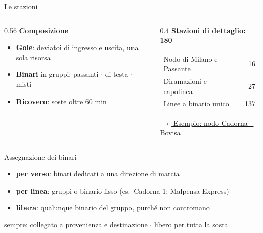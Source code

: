 \documentclass[11pt,aspectratio=169]{beamer}
\begin{document}
\begin{frame}{Le stazioni}
	\vspace*{-0.4cm}
	\begin{columns}[T]
		\begin{column}{0.56\textwidth}
			\textbf{\color{mrsAzzurro}Composizione}
			\begin{itemize}
				\item \textbf{Gole}: deviatoi di ingresso e uscita, una sola risorsa
				\item \textbf{Binari} in gruppi: passanti $\cdot$ di testa $\cdot$ misti
				\item \textbf{Ricovero}: soste oltre 60 min
			\end{itemize}
		\end{column}
		\begin{column}{0.4\textwidth}
			\textbf{\color{mrsAzzurro}Stazioni di dettaglio: 180}\par\smallskip
			\begin{tabular}{@{}lr@{}}
				\toprule
				Nodo di Milano e Passante & 16 \\
				Diramazioni e capolinea & 27 \\
				Linee a binario unico & 137 \\
				\bottomrule
			\end{tabular}\par\medskip
			{\small\hyperlink{cadorna}{\color{mrsAzzurro}$\rightarrow$ Esempio: nodo Cadorna -- Bovisa}}
		\end{column}
	\end{columns}
	\vfill
	\begin{block}{Assegnazione dei binari}
		\begin{itemize}
			\item \textbf{per verso}: binari dedicati a una direzione di marcia
			\item \textbf{per linea}: gruppi o binario fisso (es.\ Cadorna 1: Malpensa Express)
			\item \textbf{libera}: qualunque binario del gruppo, purché non contromano
		\end{itemize}
		{\small sempre: collegato a provenienza e destinazione $\cdot$ libero per tutta la sosta}
	\end{block}
\end{frame}
\end{document}

